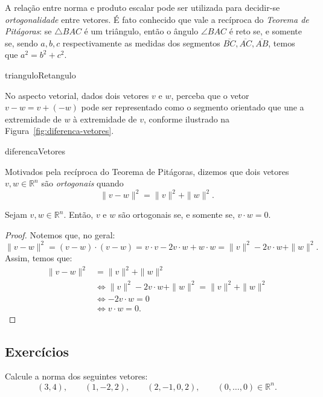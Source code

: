 A relação entre norma e produto escalar pode ser utilizada para decidir-se \emph{ortogonalidade} entre vetores.
É fato conhecido que vale a recíproca do \emph{Teorema de Pitágoras}: se $\triangle BAC$ é um triângulo, então o ângulo $\angle BAC$ é reto se, e somente se, sendo $a, b, c$ respectivamente as medidas dos segmentos $\overline{BC}, \overline{AC}, \overline{AB}$, temos que $a^2=b^2+c^2$.

{trianguloRetangulo}

No aspecto vetorial, dados dois vetores $v$ e $w$, perceba que o vetor $v-w=v+(-w)$ pode ser representado como o segmento orientado que une a extremidade de $w$ à extremidade de $v$, conforme ilustrado na Figura~\ref{fig:diferenca-vetores}.

{diferencaVetores}

Motivados pela recíproca do Teorema de Pitágoras, dizemos que dois vetores $v,w\in\mathbb R^n$ são \emph{ortogonais} quando
\[
    \|v-w\|^2=\|v\|^2+\|w\|^2.
\]

\begin{proposition}
    Sejam $v, w \in \mathbb R^n$. Então, $v$ e $w$ são ortogonais se, e somente se, $v \cdot w = 0$.
\end{proposition}
\begin{proof}
    Notemos que, no geral:
    \begin{equation*}
        \|v-w\|^2 = (v-w) \cdot (v-w) = v \cdot v - 2v \cdot w + w \cdot w = \|v\|^2 - 2v \cdot w + \|w\|^2.
    \end{equation*}
    Assim, temos que:
    \begin{align*}
        \|v-w\|^2 &= \|v\|^2 + \|w\|^2 \\
        &\iff \|v\|^2 - 2v \cdot w + \|w\|^2 = \|v\|^2 + \|w\|^2 \\
        &\iff -2v \cdot w = 0 \\
        &\iff v \cdot w = 0.
    \end{align*}
\end{proof}

\subsection*{Exercícios}

\begin{exercise}
    Calcule a norma dos seguintes vetores:
    \[
        (3,4),\qquad (1,-2,2),\qquad (2,-1,0,2),\qquad (0,\ldots,0)\in\mathbb R^n.
    \]
\end{exercise}

